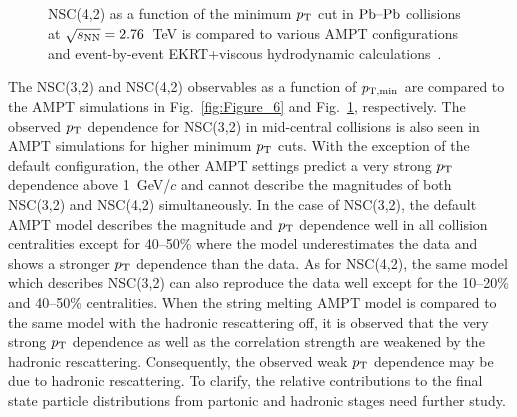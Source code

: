 \begin{figure}[p]
             \begin{center}
              \end{center}
             \caption{NSC(4,2) as a function of the minimum $p_{\rm T}$ cut in $\textnormal{Pb--Pb}$ collisions at $\sqrt{s_{\textnormal{NN}}}=2.76$~TeV is compared to various AMPT configurations and event-by-event EKRT+viscous hydrodynamic calculations~\cite{Niemi:2015qia}.}
             \label{fig:Figure_7}
\end{figure}

The NSC(3,2) and NSC(4,2) observables as a function of $p_{\rm T, min}$ are compared to the {AMPT} simulations in Fig.~\ref{fig:Figure_6} and Fig.~\ref{fig:Figure_7}, respectively.
The observed $p_{\rm T}$ dependence for NSC(3,2) in mid-central collisions is also seen in AMPT simulations for higher minimum $p_{\rm T}$ cuts.
With the exception of the default configuration, the other AMPT settings predict a very strong $p_{\rm T}$ dependence above 1~GeV/$c$ and cannot describe the magnitudes of both NSC(3,2) and NSC(4,2) simultaneously.
In the case of NSC(3,2), the default AMPT model describes the magnitude and $p_{\rm T}$ dependence well in all collision centralities except for 40--50\% where the model underestimates the data and shows a stronger $p_{\rm T}$ dependence than the data.
As for  NSC(4,2), the same model which describes NSC(3,2) can also reproduce the data well except for the 10--20\% and 40--50\% centralities.
When the string melting AMPT model is compared to the same model with the hadronic rescattering off, it is observed that the very strong $p_{\rm T}$ dependence as well as the correlation strength are weakened by the hadronic rescattering.
Consequently, the observed weak $p_{\rm T}$ dependence may be due to hadronic rescattering. To clarify, the relative contributions to the final state particle distributions from partonic and hadronic stages need further study.

